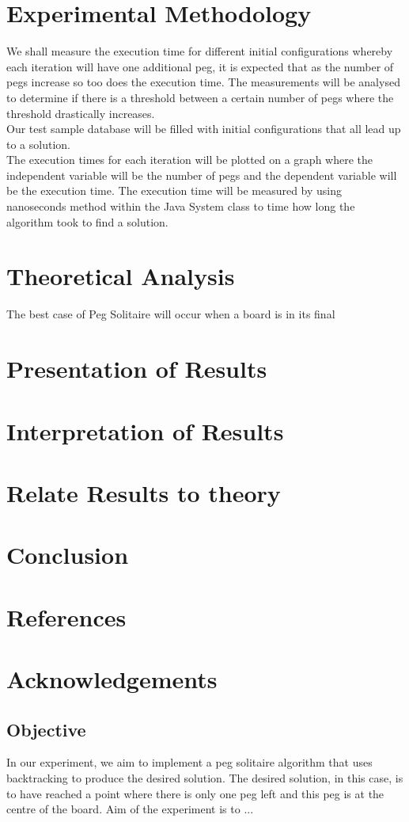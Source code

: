 \documentclass[12pt]{article}
\begin{document}
\section{Experimental Methodology}
We shall measure the execution time for different initial configurations whereby each iteration will have one additional peg, it is expected that as the number of pegs increase so too does the execution time. The measurements will be analysed to determine if there is a threshold between a certain number of pegs where the threshold drastically increases.
\\Our test sample database will be filled with initial configurations that all lead up to a solution.
\\The execution times for each iteration will be plotted on a graph where the independent variable will be the number of pegs and the dependent variable will be the execution time. The execution time will be measured by using nanoseconds method within the Java System class to time how long the algorithm took to find a solution.

\section{Theoretical Analysis}
The best case of Peg Solitaire will occur when a board is in its final 

\section{Presentation of Results}

\section{Interpretation of Results}

\section{Relate Results to theory}

\section{Conclusion}

\section{References}

\section{Acknowledgements}



\subsection{Objective}
In our experiment, we aim to implement a peg solitaire algorithm that uses backtracking to produce the desired solution. The desired solution, in this case, is to have reached a point where there is only one peg left and this peg is at the centre of the board.
Aim of the experiment is to ...
\end{document}
